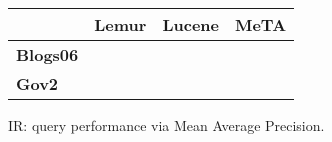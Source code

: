 \begin{figure}[t]
\centering
{\small
\begin{tabular}{|l|r|r|r|}
    \hline & \textbf{Lemur} & \textbf{Lucene} & \textbf{MeTA} \\
    \hline
    \textbf{Blogs06} & & & \\
    \textbf{Gov2} & & & \\
    \hline
\end{tabular}
}
\caption{IR: query performance via Mean Average Precision.}
\label{fig:ir-map}
\end{figure}
